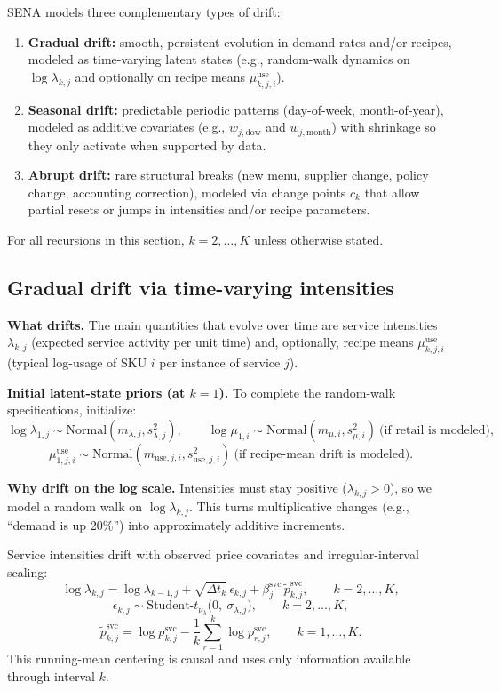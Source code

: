 \documentclass[11pt]{article}
\begin{document}
SENA models three complementary types of drift:
\begin{enumerate}
  \item \textbf{Gradual drift:} smooth, persistent evolution in demand rates and/or recipes, modeled as time-varying latent states (e.g., random-walk dynamics on $\log \lambda_{k,j}$ and optionally on recipe means $\mu^{\mathrm{use}}_{k,j,i}$).
  \item \textbf{Seasonal drift:} predictable periodic patterns (day-of-week, month-of-year), modeled as additive covariates (e.g., $w_{j,\text{dow}}$ and $w_{j,\text{month}}$) with shrinkage so they only activate when supported by data.
  \item \textbf{Abrupt drift:} rare structural breaks (new menu, supplier change, policy change, accounting correction), modeled via change points $c_k$ that allow partial resets or jumps in intensities and/or recipe parameters.
\end{enumerate}
For all recursions in this section, $k=2,\dots,K$ unless otherwise stated.

\subsection{Gradual drift via time-varying intensities}

\textbf{What drifts.} The main quantities that evolve over time are service intensities $\lambda_{k,j}$ (expected service activity per unit time) and, optionally, recipe means $\mu^{\mathrm{use}}_{k,j,i}$ (typical log-usage of SKU $i$ per instance of service $j$).

\textbf{Initial latent-state priors (at $k=1$).} To complete the random-walk specifications, initialize:
\[
  \log \lambda_{1,j}\sim\text{Normal}(m_{\lambda,j},s_{\lambda,j}^2),\qquad
  \log \mu_{1,i}\sim\text{Normal}(m_{\mu,i},s_{\mu,i}^2)\ \text{(if retail is modeled)},
\]
\[
  \mu^{\mathrm{use}}_{1,j,i}\sim\text{Normal}(m_{\mathrm{use},j,i},s_{\mathrm{use},j,i}^2)\ \text{(if recipe-mean drift is modeled)}.
\]

\textbf{Why drift on the log scale.} Intensities must stay positive ($\lambda_{k,j}>0$), so we model a random walk on $\log \lambda_{k,j}$.
This turns multiplicative changes (e.g., ``demand is up 20\%'') into approximately additive increments.

Service intensities drift with observed price covariates and irregular-interval scaling:
\[
  \log \lambda_{k,j} = \log \lambda_{k-1,j} + \sqrt{\Delta t_k}\,\epsilon_{k,j} + \beta^{\mathrm{svc}}_j\,\tilde p^{\mathrm{svc}}_{k,j},\qquad k=2,\dots,K,
\]
\[
  \epsilon_{k,j} \sim \text{Student-}t_{\nu_{\lambda}}\bigl(0,\ \sigma_{\lambda,j}\bigr),\qquad k=2,\dots,K,
\]
\[
  \tilde p^{\mathrm{svc}}_{k,j} = \log p^{\mathrm{svc}}_{k,j} - \frac{1}{k}\sum_{r=1}^{k} \log p^{\mathrm{svc}}_{r,j},\qquad k=1,\dots,K.
\]
This running-mean centering is causal and uses only information available through interval $k$.
\end{document}
